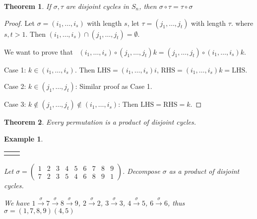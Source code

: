 \documentclass{article}
\theoremstyle{MyNonumberplain}
\theoremstyle{break}
\newtheorem*{proof}{Proof. }
\newcommand{\nline}{\begin{tabular}{ll}&\\\end{tabular}}
\newcommand{\nin}{\not\in}
\newcommand{\tmop}{\text}
\theoremstyle{break}
\newtheorem{theorem}{Theorem}[section]
\newtheorem{example}{Example}[section]
\theoremstyle{break}
\theoremstyle{definition}
\theoremstyle{break}
\begin{document}
\begin{thmbox}
    \begin{theorem}
        If $\sigma, \tau$ are disjoint cycles in $S_n$, then $\sigma \circ \tau = \tau \circ \sigma$
    \end{theorem}
    \begin{prfbox}
        \begin{proof}
            Let $\sigma = (i_1, \ldots, i_s)$ with length $s$, let $\tau = (j_1, \ldots,
            j_t)$ with length $\tau$. where $s, t > 1$. Then $(i_1, \ldots, i_s) \cap (j_1, \ldots, j_t) = \emptyset$. \bigskip
            
            We want to prove that \ $(i_1, \ldots, i_s) \circ (j_1, \ldots, j_t) k = (j_1, \ldots, j_t) \circ (i_1, \ldots, i_s) k$.\bigskip

            Case 1: $k \in (i_1, \ldots, i_s)$. Then $\tmop{LHS} = (i_1, \ldots, i_s) i$,
            $\tmop{RHS} = (i_1, \ldots, i_s) k = \tmop{LHS}$.\bigskip

            Case 2: $k \in (j_1, \ldots, j_t)$: Similar proof as Case 1.\bigskip

            Case 3: $k \nin (j_1, \ldots, j_t) \nin (i_1, \ldots, i_s)$: Then $\tmop{LHS}
            = \tmop{RHS} = k$.
        \end{proof}
    \end{prfbox}
\end{thmbox}

\begin{thmbox}
    \begin{theorem}
        Every permutation is a product of disjoint cycles. 
    \end{theorem}
\end{thmbox}

\begin{expbox}
    \begin{example}

        \nline

        Let $\sigma = \left(\begin{array}{ccccccccc}
            1 & 2 & 3 & 4 & 5 & 6 & 7 & 8 & 9\\
            7 & 2 & 3 & 5 & 4 & 6 & 8 & 9 & 1
          \end{array}\right)$. Decompose $\sigma$ as a product of disjoint cycles.

          \begin{ansbox}
            We have $1 \xrightarrow{\sigma} 7 \xrightarrow{\sigma} 8 \xrightarrow{\sigma}
            9$, $2 \xrightarrow{\sigma} 2$, $3 \xrightarrow{\sigma} 3$, $4
            \xrightarrow{\sigma} 5$, $6 \xrightarrow{\sigma} 6$, thus $\sigma = (1, 7, 8,
            9) (4, 5)$
  
          \end{ansbox}
          
    \end{example}
\end{expbox}
\end{document}
